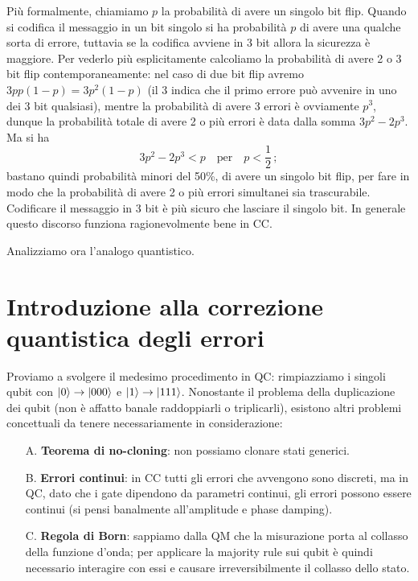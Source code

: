 \noindent Più formalmente, chiamiamo $p$ la probabilità di avere un singolo bit flip. Quando si codifica il messaggio in un bit singolo si ha probabilità $p$ di avere una qualche sorta di errore, tuttavia se la codifica avviene in 3 bit allora la sicurezza è maggiore. Per vederlo più esplicitamente calcoliamo la probabilità di avere 2 o 3 bit flip contemporaneamente: nel caso di due bit flip avremo $3 p p (1-p) = 3 p^2(1-p)$ (il 3 indica che il primo errore può avvenire in uno dei 3 bit qualsiasi), mentre la probabilità di avere 3 errori è ovviamente $p^3$, dunque la probabilità totale di avere 2 o più errori è data dalla somma $3p^2-2p^3$. Ma si ha
\begin{equation}\label{prob_2_simult}
    3p^2-2p^3 < p \quad \text{per} \quad p < \frac{1}{2} \, ;
\end{equation}
bastano quindi probabilità minori del 50\%, di avere un singolo bit flip, per fare in modo che la probabilità di avere 2 o più errori simultanei sia trascurabile. Codificare il messaggio in 3 bit è più sicuro che lasciare il singolo bit. In generale questo discorso funziona ragionevolmente bene in CC. 

\noindent Analizziamo ora l'analogo quantistico.

\section{Introduzione alla correzione quantistica degli errori}\label{sec:intro_error_corr}
Proviamo a svolgere il medesimo procedimento in QC: rimpiazziamo i singoli qubit con $\ket{0} \to \ket{000}$ e $\ket{1} \to \ket{111}$. Nonostante il problema della duplicazione dei qubit (non è affatto banale raddoppiarli o triplicarli), esistono altri problemi concettuali da tenere necessariamente in considerazione:
\begin{itemize}
    \item[A.] \textbf{Teorema di no-cloning}: non possiamo clonare stati generici. 
    
    \item[B.] \textbf{Errori continui}: in CC tutti gli errori che avvengono sono discreti, ma in QC, dato che i gate dipendono da parametri continui, gli errori possono essere continui (si pensi banalmente all'amplitude e phase damping).
    
    \item[C.] \textbf{Regola di Born}: sappiamo dalla QM che la misurazione porta al collasso della funzione d'onda; per applicare la majority rule sui qubit è quindi necessario interagire con essi e causare irreversibilmente il collasso dello stato.
\end{itemize}

